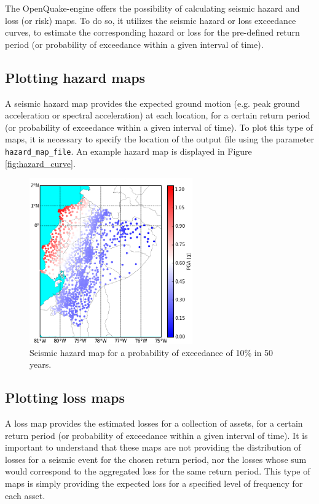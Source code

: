 The OpenQuake-engine offers the possibility of calculating seismic hazard and loss (or risk) maps. To do so, it utilizes the seismic hazard or loss exceedance curves, to estimate the corresponding hazard or loss for the pre-defined return period (or probability of exceedance within a given interval of time).

\subsection{Plotting hazard maps}
\label{subsec:plot-hazard_maps}
A seismic hazard map provides the expected ground motion (e.g. peak ground acceleration or spectral acceleration) at each location, for a certain return period (or probability of exceedance within a given interval of time). To plot this type of maps, it is necessary to specify the location of the output file using the parameter \verb=hazard_map_file=. An example hazard map is displayed in Figure \ref{fig:hazard_curve}.

\begin{figure}[htb]
  \centering
      \includegraphics[width=7cm]{figures/hazard_Ecuador.eps}
  \caption{Seismic hazard map for a probability of exceedance of 10\% in 50 years.}
  \label{fig:hazard_map}
\end{figure}

\subsection{Plotting loss maps}
\label{subsec:plot-loss_maps}
A loss map provides the estimated losses for a collection of assets, for a certain return period (or probability of exceedance within a given interval of time). It is important to understand that these maps are not providing the distribution of losses for a seismic event for the chosen return period, nor the losses whose sum would correspond to the aggregated loss for the same return period. This type of maps is simply providing the expected loss for a specified level of frequency for each asset.

